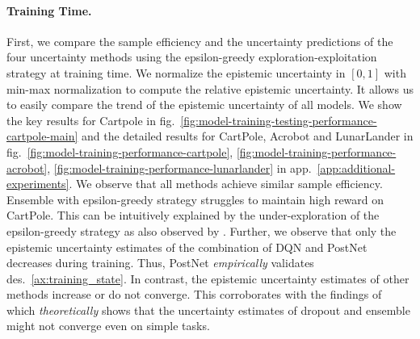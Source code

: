\paragraph{Training Time.} First, we compare the sample efficiency and the uncertainty predictions of the four uncertainty methods using the epsilon-greedy exploration-exploitation strategy at training time. We normalize the epistemic uncertainty in $[0, 1]$ with min-max normalization to compute the relative epistemic uncertainty. It allows us to easily compare the trend of the epistemic uncertainty of all models. We show the key results for Cartpole in fig.~\ref{fig:model-training-testing-performance-cartpole-main} and the detailed results for CartPole, Acrobot and LunarLander in fig.~\ref{fig:model-training-performance-cartpole}, \ref{fig:model-training-performance-acrobot}, \ref{fig:model-training-performance-lunarlander} in app.~\ref{app:additional-experiments}. We observe that all methods achieve similar sample efficiency. Ensemble with epsilon-greedy strategy struggles to maintain high reward on CartPole. This can be intuitively explained by the under-exploration of the epsilon-greedy strategy as also observed by \cite{randomized-prior-functions, dropout}. Further, we observe that only the epistemic uncertainty estimates of the combination of DQN and PostNet decreases during training. Thus, PostNet \emph{empirically} validates des.~\ref{ax:training_state}. In contrast, the epistemic uncertainty estimates of other methods increase or do not converge. This corroborates with the findings of \cite{randomized-prior-functions} which \emph{theoretically} shows that the uncertainty estimates of dropout and ensemble might not converge even on simple tasks.

